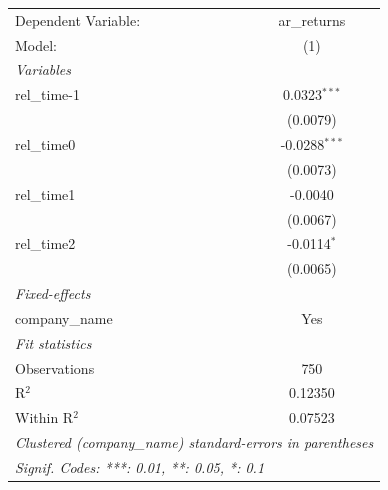 
\begingroup
\centering
\begin{tabular}{lc}
   \tabularnewline \midrule \midrule
   Dependent Variable: & ar\_returns\\   
   Model:              & (1)\\  
   \midrule
   \emph{Variables}\\
   rel\_time-1         & 0.0323$^{***}$\\   
                       & (0.0079)\\   
   rel\_time0          & -0.0288$^{***}$\\   
                       & (0.0073)\\   
   rel\_time1          & -0.0040\\   
                       & (0.0067)\\   
   rel\_time2          & -0.0114$^{*}$\\   
                       & (0.0065)\\   
   \midrule
   \emph{Fixed-effects}\\
   company\_name       & Yes\\  
   \midrule
   \emph{Fit statistics}\\
   Observations        & 750\\  
   R$^2$               & 0.12350\\  
   Within R$^2$        & 0.07523\\  
   \midrule \midrule
   \multicolumn{2}{l}{\emph{Clustered (company\_name) standard-errors in parentheses}}\\
   \multicolumn{2}{l}{\emph{Signif. Codes: ***: 0.01, **: 0.05, *: 0.1}}\\
\end{tabular}
\par\endgroup


